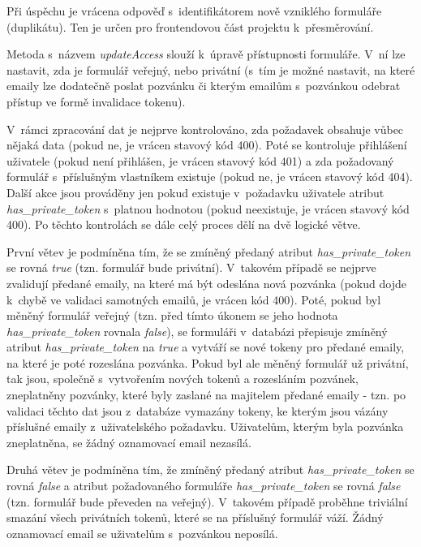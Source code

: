 			Při úspěchu je vrácena odpověď s~identifikátorem nově vzniklého formuláře (duplikátu). Ten je určen pro frontendovou část projektu k~přesměrování.
								
			\label{sec:form_accessibility}
			Metoda s~názvem \textit{updateAccess} slouží k~úpravě přístupnosti formuláře. V~ní lze nastavit, zda je formulář veřejný, nebo privátní (s~tím je možné nastavit, na které emaily lze dodatečně poslat pozvánku či kterým emailům s~pozvánkou odebrat přístup ve formě invalidace tokenu).
			
			V~rámci zpracování dat je nejprve kontrolováno, zda požadavek obsahuje vůbec nějaká data (pokud ne, je vrácen stavový kód 400). Poté se kontroluje přihlášení uživatele (pokud není přihlášen, je vrácen stavový kód 401) a zda požadovaný formulář s~příslušným vlastníkem existuje (pokud ne, je vrácen stavový kód 404). Další akce jsou prováděny jen pokud existuje v~požadavku uživatele atribut \textit{has\_private\_token} s~platnou hodnotou (pokud neexistuje, je vrácen stavový kód 400). Po těchto kontrolách se dále celý proces dělí na dvě logické větve. 
			
			První větev je podmíněna tím, že se zmíněný předaný atribut \textit{has\_private\_token} se rovná \textit{true} (tzn. formulář bude privátní). V~takovém případě se nejprve zvalidují předané emaily, na které má být odeslána nová pozvánka (pokud dojde k~chybě ve validaci samotných emailů, je vrácen kód 400). Poté, pokud byl měněný formulář veřejný (tzn. před tímto úkonem se jeho hodnota \textit{has\_private\_token} rovnala \textit{false}), se formuláři v~databázi přepisuje zmíněný atribut \textit{has\_private\_token} na \textit{true} a vytváří se nové tokeny pro předané emaily, na které je poté rozeslána pozvánka. Pokud byl ale měněný formulář už privátní, tak jsou, společně s~vytvořením nových tokenů a rozesláním pozvánek, zneplatněny pozvánky, které byly zaslané na majitelem předané emaily - tzn. po validaci těchto dat jsou z~databáze vymazány tokeny, ke kterým jsou vázány příslušné emaily z~uživatelského požadavku. Uživatelům, kterým byla pozvánka zneplatněna, se žádný oznamovací email nezasílá.
			
			Druhá větev je podmíněna tím, že zmíněný předaný atribut \textit{has\_private\_token} se rovná \textit{false} a atribut požadovaného formuláře \textit{has\_private\_token} se rovná \textit{false} (tzn. formulář bude převeden na veřejný). V~takovém případě proběhne triviální smazání všech privátních tokenů, které se na příslušný formulář váží. Žádný oznamovací email se uživatelům s~pozvánkou neposílá.
			
